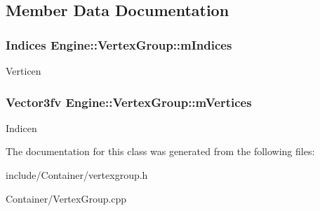 \subsection{Member Data Documentation}
\hypertarget{classEngine_1_1VertexGroup_a861305426038488e7fdf3bc4ad3f0003}{}
\subsubsection[{m\+Indices}]{\setlength{\rightskip}{0pt plus 5cm}Indices Engine\+::\+Vertex\+Group\+::m\+Indices\hspace{0.3cm}{\ttfamily [protected]}}\label{classEngine_1_1VertexGroup_a861305426038488e7fdf3bc4ad3f0003}
Verticen \hypertarget{classEngine_1_1VertexGroup_aaac98ddabec44449cf49a936b6197a8d}{}
\subsubsection[{m\+Vertices}]{\setlength{\rightskip}{0pt plus 5cm}Vector3fv Engine\+::\+Vertex\+Group\+::m\+Vertices\hspace{0.3cm}{\ttfamily [protected]}}\label{classEngine_1_1VertexGroup_aaac98ddabec44449cf49a936b6197a8d}
Indicen 

The documentation for this class was generated from the following files\+:\begin{DoxyCompactItemize}
\item 
include/\+Container/vertexgroup.\+h\item 
Container/Vertex\+Group.\+cpp\end{DoxyCompactItemize}
